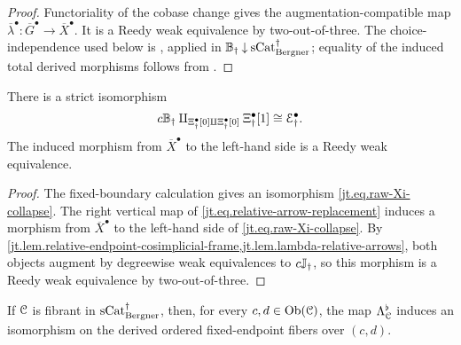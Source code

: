 \documentclass[a4paper,dvipdfmx,11pt]{amsart}
\begin{document}
\begin{proof}
  Functoriality of the cobase change gives the augmentation-compatible map $\overline\lambda^{\bullet}:\overline G^{\bullet}\to\overline X^{\bullet}$.
  It is a Reedy weak equivalence by two-out-of-three.
  The choice-independence used below is \cite[Theorem~16.6.18 (1)]{Hir02}, applied in $\mathbb{B}_{\dag}\mathbin{\downarrow}\mathrm{sCat}^{\dag}_{\mathrm{Bergner}}$;
  equality of the induced total derived morphisms follows from \cite[Lemmas~5.5.1 and~5.5.2]{Hov99}.
\end{proof}

\begin{lemma}\label{jt.lem.xi-endpoint-collapse}
  There is a strict isomorphism
  \begin{align}\label{jt.eq.raw-Xi-collapse}
    c\mathbb{B}_{\dag}
    \amalg_{
      \Xi^{\bullet}_{\dag}[0]
      \amalg\Xi^{\bullet}_{\dag}[0]}
      \Xi^{\bullet}_{\dag}[1]
    \cong
    \mathcal{E}^{\bullet}_{\dag}.
  \end{align}
  The induced morphism from $\overline X^{\bullet}$ to the left-hand side is a Reedy weak equivalence.
\end{lemma}

\begin{proof}
  The fixed-boundary calculation gives an isomorphism \eqref{jt.eq.raw-Xi-collapse}.
  The right vertical map of \eqref{jt.eq.relative-arrow-replacement} induces a morphism from $\overline X^{\bullet}$ to the left-hand side of \eqref{jt.eq.raw-Xi-collapse}.
  By \cref{jt.lem.relative-endpoint-cosimplicial-frame,jt.lem.lambda-relative-arrows}, both objects augment by degreewise weak equivalences to $c\mathbb{J}_{\dag}$, so this morphism is a Reedy weak equivalence by two-out-of-three.
\end{proof}

\begin{proposition}\label{jt.lem.ordered-lambda-mate}
  If $\mathcal{C}$ is fibrant in $\mathrm{sCat}^{\dag}_{\mathrm{Bergner}}$, then, for every $c,d\in\operatorname{Ob}(\mathcal{C})$, the map $\Lambda^{\flat}_{\mathcal{C}}$ induces an isomorphism on the derived ordered fixed-endpoint fibers over $(c,d)$.
\end{proposition}
\end{document}
